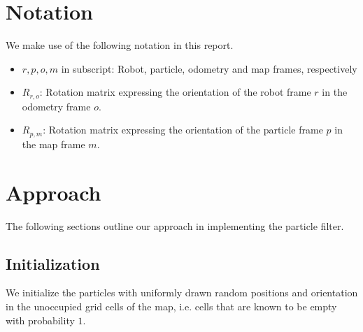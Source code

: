\documentclass[11pt]{article}
\begin{document}
\section{Notation}
We make use of the following notation in this report.
\begin{itemize}
\item $r,p,o,m$ in subscript: Robot, particle, odometry and map frames, respectively
\item $R_{r,o}$: Rotation matrix expressing the orientation of the robot frame $r$ in the odometry frame $o$.
\item $R_{p,m}$: Rotation matrix expressing the orientation of the particle frame $p$ in the map frame $m$.
\end{itemize}

\section{Approach}
The following sections outline our approach in implementing the particle filter.

\subsection{Initialization}
We initialize the particles with uniformly drawn random positions and orientation in the unoccupied grid cells of the map, i.e. cells that are known to be empty with probability $1$.
\end{document}
